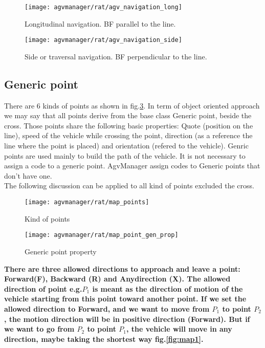 \begin{figure}[h]
	\centering\texttt{[image: agvmanager/rat/agv\_navigation\_long]}
	\caption{Longitudinal navigation. BF parallel to the line.}
	\label{fig:navigLong}
\end{figure}
\begin{figure}[h]
	\centering\texttt{[image: agvmanager/rat/agv\_navigation\_side]}
	\caption{Side or traversal navigation. BF perpendicular to the line.}
	\label{fig:navigSide}
\end{figure}

\subsection{Generic point}
There are 6 kinds of points as shown in fig.\ref{fig:pointKind}. In term of object oriented approach we may say that all points derive from the base class Generic point, beside the cross.
Those points share the following basic properties: Quote (position on the line), speed of the vehicle while crossing the point, direction (as a reference the line where the point is placed) and orientation (refered to the vehicle).
Genric points are used mainly to build the path of the vehicle. It is not necessary to assign a code to a generic point. AgvManager assign codes to Generic points that don't have one.\\

The following discussion can be applied to all kind of points excluded the cross.

\begin{figure}[h]
	\centering\texttt{[image: agvmanager/rat/map\_points]}
	\caption{Kind of points}
	\label{fig:pointKind}
\end{figure}
\begin{figure}[h]
	\centering\texttt{[image: agvmanager/rat/map\_point\_gen\_prop]}
	\caption{Generic point property}
	\label{fig:GenericPoint}
\end{figure}

\textbf{There are three allowed directions to approach and leave a point: Forward(F), Backward (R) and Anydirection (X). The allowed direction of point e.g.$P_{1}$ is meant as the direction of motion of the vehicle starting from this point toward another point. If we set the allowed direction to Forward, and we want to move from $P_{1}$ to point $P_{2}$, the motion direction will be in positive direction (Forward). But if we want to go from $P_{2}$ to point $P_{1}$, the vehicle will move in any direction, maybe taking the shortest way fig.\ref{fig:map1}.\\}


